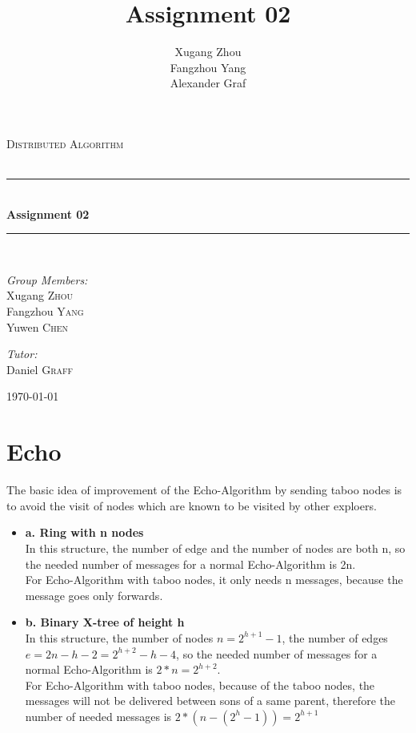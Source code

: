 \documentclass[a4paper, 14pt]{article}
\title{\bf Assignment 02}
\author{Xugang Zhou \\ Fangzhou Yang \\ Alexander Graf}
\newcommand{\HRule}{\rule{\linewidth}{0.5mm}}
\begin{document}
\begin{titlepage}
\begin{center}
\vfill
\textsc{\LARGE Distributed Algorithm}\\[1.5cm]
\textsc{\Large }\\[0.5cm]

\HRule \\[0.4cm]
{\huge \bfseries Assignment 02}\\[0.4cm]
\HRule \\[1.5cm]
\begin{minipage}{0.4\textwidth}
\begin{flushleft} \large
\emph{Group Members:}\\
Xugang \textsc{Zhou}\\
Fangzhou \textsc{Yang}\\
Yuwen  \textsc{Chen}
\end{flushleft}
\end{minipage}
\begin{minipage}{0.4\textwidth}
\begin{flushright} \large
\emph{Tutor:} \\
Daniel \textsc{Graff}\\
\end{flushright}
\end{minipage}
\vfill
{\large \today}\\
\end{center}
\end{titlepage}
\thispagestyle{fancy}

\section{Echo}
The basic idea of improvement of the Echo-Algorithm by sending taboo nodes is to avoid the visit of nodes which are known to be visited by other exploers.
\begin {itemize}
\item {\bf a. Ring with n nodes} \\
In this structure, the number of edge and the number of nodes are both n, so the needed number of messages for a normal Echo-Algorithm is 2n. \\
For Echo-Algorithm with taboo nodes, it only needs n messages, because the message goes only forwards.
\item {\bf b. Binary X-tree of height h}\\
In this structure, the number of nodes $n = 2^{h+1} - 1$, the number of edges $e = 2n - h -2 = 2^{h+2} - h -4$, so the needed number of messages for a normal Echo-Algorithm is $2*n = 2^{h+2}$.\\
For Echo-Algorithm with taboo nodes, because of the taboo nodes, the messages will not be delivered between sons of a same parent, therefore the number of needed messages is $2*(n - (2^{h} -1)) = 2^{h+1}$
\end {itemize}
\end{document}
